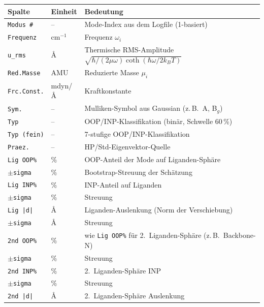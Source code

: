 \documentclass[11pt,a4paper,twoside]{article}
\providecommand{\angstrom}{\text{\AA}}    %
\theoremstyle{remark}
\begin{document}
\begin{center}
\small
\begin{tabular}{p{3.6cm}p{1.4cm}p{8.4cm}}
\toprule
\textbf{Spalte} & \textbf{Einheit} & \textbf{Bedeutung} \\
\midrule
\texttt{Modus \#}        & --       & Mode-Index aus dem Logfile (1-basiert) \\
\texttt{Frequenz}        & cm$^{-1}$ & Frequenz $\omega_i$ \\
\texttt{u\_rms}          & $\angstrom$ & Thermische RMS-Amplitude
                                       $\sqrt{\hbar/(2\mu\omega)\coth(\hbar\omega/2k_BT)}$ \\
\texttt{Red.Masse}       & AMU      & Reduzierte Masse $\mu_i$ \\
\texttt{Frc.Const.}      & mdyn/$\angstrom$ & Kraftkonstante \\
\texttt{Sym.}            & --       & Mulliken-Symbol aus Gaussian (z.\,B.\ A, B$_g$) \\
\texttt{Typ}             & --       & OOP/INP-Klassifikation
                                       (bin\"ar, Schwelle 60\,\%) \\
\texttt{Typ (fein)}      & --       & 7-stufige OOP/INP-Klassifikation \\
\texttt{Praez.}          & --       & HP/Std-Eigenvektor-Quelle \\
\texttt{Lig OOP\%}       & \%       & OOP-Anteil der Mode auf
                                       Liganden-Sph\"are \\
\texttt{$\pm$sigma}      & \%       & Bootstrap-Streuung der Sch\"atzung \\
\texttt{Lig INP\%}       & \%       & INP-Anteil auf Liganden \\
\texttt{$\pm$sigma}      & \%       & Streuung \\
\texttt{Lig |d|}         & $\angstrom$ & Liganden-Auslenkung
                                          (Norm der Verschiebung) \\
\texttt{$\pm$sigma}      & $\angstrom$ & Streuung \\
\texttt{2nd OOP\%}       & \%       & wie \texttt{Lig OOP\%} f\"ur
                                       2.\ Liganden-Sph\"are
                                       (z.\,B.\ Backbone-N) \\
\texttt{$\pm$sigma}      & \%       & Streuung \\
\texttt{2nd INP\%}       & \%       & 2.\ Liganden-Sph\"are INP \\
\texttt{$\pm$sigma}      & \%       & Streuung \\
\texttt{2nd |d|}         & $\angstrom$ & 2.\ Liganden-Sph\"are
                                          Auslenkung \\
\bottomrule
\end{tabular}
\end{center}
\end{document}
